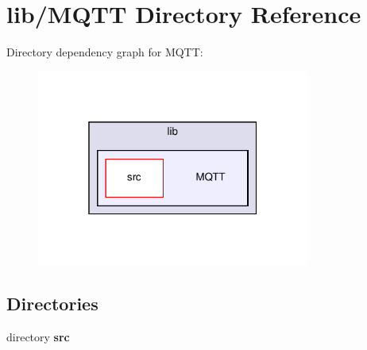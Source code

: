 \section{lib/\+M\+Q\+TT Directory Reference}
\label{dir_8e7512edcd5e94a3e076e17310f31cb9}
Directory dependency graph for M\+Q\+TT\+:\nopagebreak
\begin{figure}[H]
\begin{center}
\leavevmode
\includegraphics[width=254pt]{dir_8e7512edcd5e94a3e076e17310f31cb9_dep}
\end{center}
\end{figure}
\subsection*{Directories}
\begin{DoxyCompactItemize}
\item 
directory \textbf{ src}
\end{DoxyCompactItemize}
